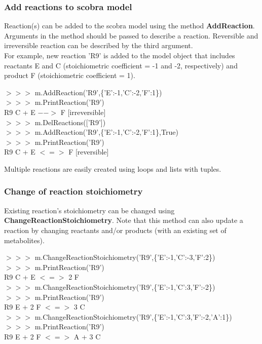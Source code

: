 
\subsubsection{Add reactions to scobra model}
Reaction(s) can be added to the scobra model using the method \textbf{AddReaction}. Arguments in the method should be passed to describe a reaction. Reversible and irreversible reaction can be described by the third argument. \\

For example, new reaction 'R9' is added to the model object that includes reactants E and C (stoichiometric coefficient = -1 and -2, respectively) and product F (stoichiometric coefficient = 1). 

\begin{framed}
$>>>$ m.AddReaction('R9',\{'E':-1,'C':-2,'F':1\})\\
$>>>$ m.PrintReaction('R9')\\
R9  C + E $-->$ F [irreversible]\\ 

$>>>$ m.DelReactions(['R9'])\\
$>>>$ m.AddReaction('R9',\{'E':-1,'C':-2,'F':1\},True)\\
$>>>$ m.PrintReaction('R9')\\
R9  C + E $<=>$ F [reversible]
\end{framed}

Multiple reactions are easily created using loops and lists with tuples.


\subsubsection{Change of reaction stoichiometry}
Existing reaction's stoichiometry can be changed using \textbf{ChangeReactionStoichiometry}. Note that this method can also update a reaction by changing reactants and/or products (with an existing set of metabolites).

\begin{framed}
$>>>$ m.ChangeReactionStoichiometry('R9',\{'E':-1,'C':-3,'F':2\})\\
$>>>$ m.PrintReaction('R9')\\
R9  C + E $<=>$ 2 F\\

$>>>$ m.ChangeReactionStoichiometry('R9',\{'E':-1,'C':3,'F':-2\})\\
$>>>$ m.PrintReaction('R9')\\
R9 \space E + 2 F $<=>$ 3 C\\

$>>>$ m.ChangeReactionStoichiometry('R9',\{'E':-1,'C':3,'F':-2,'A':1\})\\
$>>>$ m.PrintReaction('R9')\\
R9 \space E + 2 F $<=>$ A + 3 C
\end{framed}

